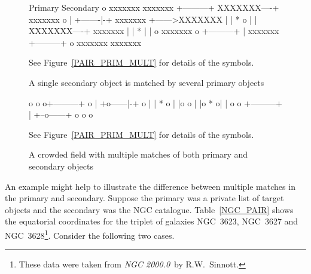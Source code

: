 \documentclass[twoside,11pt]{starlink}
\begin{document}
\begin{figure}[htbp]

\begin{terminalv}
                                        Primary           Secondary
                               o        xxxxxxx            xxxxxxx
                 +---------+            XXXXXXX----+       xxxxxxx
             o   | +-------|-+          xxxxxxx    +------>XXXXXXX
                 | |  *  o | |          XXXXXXX----+       xxxxxxx
                 | |    *  | |     o                       xxxxxxx
              o  +---------+ |                             xxxxxxx
                   +---------+ o                           xxxxxxx
                                                           xxxxxxx
\end{terminalv}

\begin{center}
See Figure~\ref{PAIR_PRIM_MULT} for details of the symbols.
\end{center}

\caption{A single secondary object is matched by several primary
objects \label{PAIR_SEC_MULT} }

\end{figure}

\begin{figure}[htbp]

\begin{terminalv}
                   o           o
                o+---------+
            o    | +o------|-+  o
                 | |  *  o | |o
              o  | |o   * o| |     o
             o   +---------+ |
                   +--o------+ o
                o          o
\end{terminalv}

\begin{center}
See Figure~\ref{PAIR_PRIM_MULT} for details of the symbols.
\end{center}

\caption{A crowded field with multiple matches of both primary and
secondary objects \label{PAIR_CROWD} }

\end{figure}

An example might help to illustrate the difference between multiple
matches in the primary and secondary. Suppose the primary was a private
list of target objects and the secondary was the NGC catalogue.
Table~\ref{NGC_PAIR} shows the equatorial coordinates for the triplet of
galaxies NGC~3623, NGC~3627 and NGC~3628\footnote{These data were taken
from \textit{NGC 2000.0}\, by R.W.~Sinnott\cite{NGC2000}.}. Consider the
following two cases.
\end{document}
